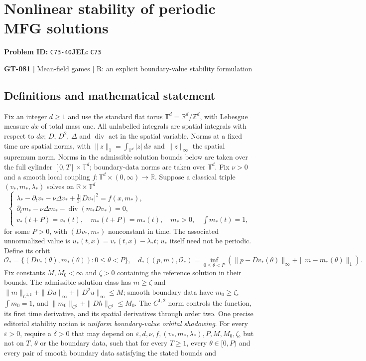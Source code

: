 \documentclass[11pt,a4paper]{article}
\newcommand{\R}{\mathbb R}
\begin{document}
\section*{Nonlinear stability of periodic MFG solutions}
\textbf{Problem ID:} \texttt{C73-40}\quad \textbf{JEL:} \texttt{C73}\par
\label{problem:OP-0211}
\label{game:GT-081}
{\sffamily\small\color{muted}
{\small\textbf{GT-081} | Mean-field games | R: an explicit boundary-value stability formulation\par}
\par}
\subsection*{Definitions and mathematical statement}
Fix an integer $d\geq1$ and use the standard flat torus $\mathbb T^d=\R^d/\mathbb Z^d$, with Lebesgue measure $dx$ of total mass one. All unlabelled integrals are spatial integrals with respect to $dx$; $D$, $D^2$, $\Delta$ and $\operatorname{div}$ act in the spatial variable. Norms at a fixed time are spatial norms, with $\|z\|_1=\int_{\mathbb T^d}|z|\,dx$ and $\|z\|_\infty$ the spatial supremum norm. Norms in the admissible solution bounds below are taken over the full cylinder $[0,T]\times\mathbb T^d$; boundary-data norms are taken over $\mathbb T^d$. Fix $\nu>0$ and a smooth local coupling $f:\mathbb T^d\times(0,\infty)\to\mathbb R$. Suppose a classical triple $(v_*,m_*,\lambda_*)$ solves on $\mathbb R\times\mathbb T^d$
\[
 \begin{cases}
 \lambda_*-\partial_t v_*-\nu\Delta v_*+\tfrac12|Dv_*|^2=f(x,m_*),\\
 \partial_t m_*-\nu\Delta m_*-\operatorname{div}(m_*Dv_*)=0,\\
 v_*(t+P)=v_*(t),\quad m_*(t+P)=m_*(t),\quad
 m_*>0,\quad\int m_*(t)=1,
 \end{cases}
\]
for some $P>0$, with $(Dv_*,m_*)$ nonconstant in time. The associated unnormalized value is $u_*(t,x)=v_*(t,x)-\lambda_*t$; $u_*$ itself need not be periodic. Define its orbit
\[
 \mathcal O_* =\{(Dv_*(\theta),m_*(\theta)):0\leq\theta<P\},
 \quad
 d_*((p,m),\mathcal O_*)=
 \inf_{0\leq\theta<P}(\|p-Dv_*(\theta)\|_\infty+\|m-m_*(\theta)\|_1).
\]
Fix constants $M,M_0<\infty$ and $\zeta>0$ containing the reference solution in their bounds. The admissible solution class has $m\geq\zeta$ and $\|m\|_{C^{1,2}}+\|Du\|_\infty+\|D^2u\|_\infty\leq M$; smooth boundary data have $m_0\geq\zeta$, $\int m_0=1$, and $\|m_0\|_{C^2}+\|Dh\|_{C^1}\leq M_0$. The $C^{1,2}$ norm controls the function, its first time derivative, and its spatial derivatives through order two. One precise editorial stability notion is \emph{uniform boundary-value orbital shadowing}. For every $\varepsilon>0$, require a $\delta>0$ that may depend on $\varepsilon,d,\nu,f,(v_*,m_*,\lambda_*),P,M,M_0,\zeta$, but not on $T$, $\theta$ or the boundary data, such that for every $T\geq1$, every $\theta\in[0,P)$ and every pair of smooth boundary data satisfying the stated bounds and
\end{document}
